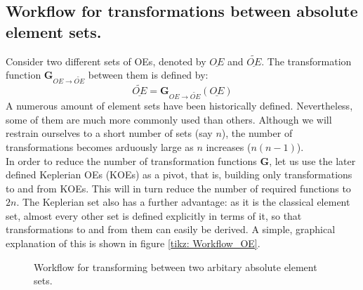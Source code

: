 	\subsection{Workflow for transformations between absolute element sets.}
	\indent Consider two different sets of OEs, denoted by $\underline{OE}$ and $\underline{\widetilde{OE}}$. The transformation function $\bm G_{OE\rightarrow\widetilde{OE}}$ between them is defined by:
	\begin{equation}
	\underline{\widetilde{OE}} = \bm G_{OE\rightarrow \widetilde{OE}} ( \underline{OE})
	\end{equation}
	\indent A numerous amount of element sets have been historically defined. Nevertheless, some of them are much more commonly used than others. Although we will restrain ourselves to a short number of sets (say $n$), the number of transformations becomes arduously large as $n$ increases ($n (n-1)$). \\
	\indent In order to reduce the number of transformation functions $\bm G$, let us use the later defined Keplerian OEs (KOEs) as a pivot, that is, building only transformations to and from KOEs. This will in turn reduce the number of required functions to $2n$. The Keplerian set also has a further advantage: as it is the classical element set, almost every other set is defined explicitly in terms of it, so that transformations to and from them can easily be derived. A simple, graphical explanation of this is shown in figure \ref{tikz: 	Workflow_OE}.
	\begin{figure}[!htb]
	\centering
{}
\caption{Workflow for transforming between two arbitary absolute element sets.}
\label{tikz: 	Workflow_OE}
\end{figure}	

